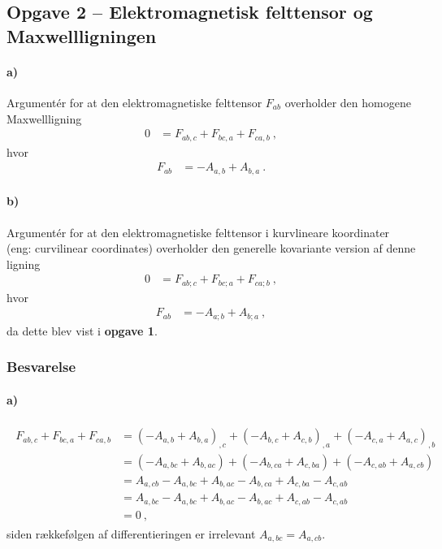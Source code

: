 \documentclass[../main.tex]{subfiles}
\begin{document}
\subsection{Opgave 2 -- Elektromagnetisk felttensor og Maxwellligningen}
\setcounter{subsection}{2}
\setcounter{equation}{0}

\paragraph{a)} Argumentér for at den elektromagnetiske felttensor $F_{ab}$ overholder den homogene Maxwellligning
\begin{align}
    0 &= F_{ab,c} + F_{bc,a} + F_{ca,b} \: ,
\end{align}
hvor
\begin{align}
    F_{ab} &= - A_{a,b} + A_{b,a} \: .
\end{align}

\paragraph{b)} Argumentér for at den elektromagnetiske felttensor i kurvlineare koordinater (eng: curvilinear coordinates) overholder den generelle kovariante version af denne ligning
\begin{align}
    0 &= F_{ab;c} + F_{bc;a} + F_{ca;b} \: ,
\end{align}
hvor
\begin{align}
    F_{ab} &= - A_{a;b} + A_{b;a} \: ,
\end{align}
da dette blev vist i \textbf{opgave 1}.


\subsubsection{Besvarelse}


\paragraph{a)}

\begin{align}
\begin{split}
    F_{ab,c} + F_{bc,a} + F_{ca,b}
        &= \left( - A_{a,b} + A_{b,a} \right)_{,c} + \left( - A_{b,c} + A_{c,b} \right)_{,a} + \left( - A_{c,a} + A_{a,c} \right)_{,b} \\
        &= \left( - A_{a,bc} + A_{b,ac} \right) + \left( - A_{b,ca} + A_{c,ba} \right) + \left( - A_{c,ab} + A_{a,cb} \right) \\
        &= A_{a,cb} - A_{a,bc} + A_{b,ac} - A_{b,ca} + A_{c,ba} - A_{c,ab} \\
        &= A_{a,bc} - A_{a,bc} + A_{b,ac} - A_{b,ac} + A_{c,ab} - A_{c,ab} \\
        &= 0 \: ,
\end{split}
\end{align}
siden rækkefølgen af differentieringen er irrelevant $A_{a,bc} = A_{a,cb}$.
\end{document}
